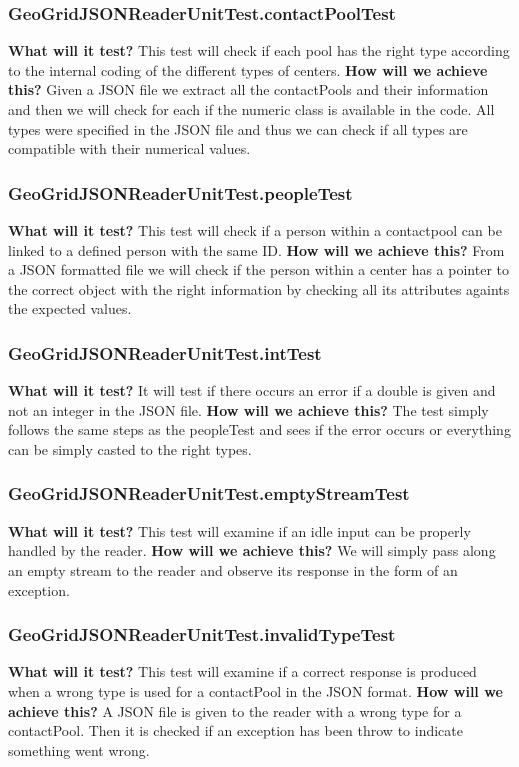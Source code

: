 \documentclass{article}
\begin{document}
\subsubsection{GeoGridJSONReaderUnitTest.contactPoolTest}
\textbf{What will it test?}
This test will check if each pool has the right type according to the internal coding of the different types of centers.
\newline
\textbf{How will we achieve this?}
Given a JSON file we extract all the contactPools and their information and then we will check for each if the numeric class is available in the code. All types were specified in the JSON file and thus we can check if all types are compatible with their numerical values.

\subsubsection{GeoGridJSONReaderUnitTest.peopleTest}
\textbf{What will it test?}
This test will check if a person within a contactpool can be linked to a defined person with the same ID.
\newline
\textbf{How will we achieve this?}
From a JSON formatted file we will check if the person within a center has a pointer to the correct object with the right information by checking all its attributes againts the expected values.

\subsubsection{GeoGridJSONReaderUnitTest.intTest}
\textbf{What will it test?}
It will test if there occurs an error if a double is given and not an integer in the JSON file.
\newline
\textbf{How will we achieve this?}
The test simply follows the same steps as the peopleTest and sees if the error occurs or everything can be simply casted to the right types.

\subsubsection{GeoGridJSONReaderUnitTest.emptyStreamTest}
\textbf{What will it test?}
This test will examine if an idle input can be properly handled by the reader.
\newline
\textbf{How will we achieve this?}
We will simply pass along an empty stream to the reader and observe its response in the form of an exception.

\subsubsection{GeoGridJSONReaderUnitTest.invalidTypeTest}
\textbf{What will it test?}
This test will examine if a correct response is produced when a wrong type is used for a contactPool in the JSON format.
\newline
\textbf{How will we achieve this?}
A JSON file is given to the reader with a wrong type for a contactPool. Then it is checked if an exception has been throw to indicate something went wrong.
\end{document}
